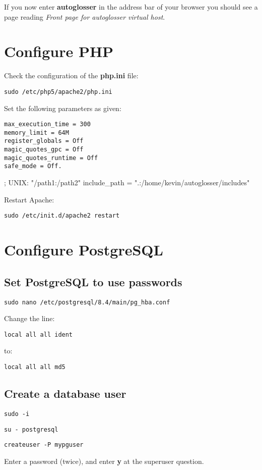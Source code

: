 \documentclass[a4paper,10pt]{article}
\begin{document}
{If you now enter \textbf{autoglosser} in the address bar of your browser you should see a page reading \textit{Front page for autoglosser virtual host}.

\section{Configure PHP}

Check the configuration of the \textbf{php.ini} file:

\texttt{sudo /etc/php5/apache2/php.ini}

Set the following parameters as given:

\begin{verbatim}
max_execution_time = 300
memory_limit = 64M
register_globals = Off
magic_quotes_gpc = Off
magic_quotes_runtime = Off
safe_mode = Off.
\end{verbatim}

; UNIX: "/path1:/path2"
include\_path = ".:/home/kevin/autoglosser/includes"


Restart Apache:

\texttt{sudo /etc/init.d/apache2 restart}

\section{Configure PostgreSQL}

\subsection{Set PostgreSQL to use passwords}

\texttt{sudo nano /etc/postgresql/8.4/main/pg\_hba.conf}

Change the line:

\texttt{local   all	all	ident}

to:

\texttt{local   all	all	md5}

\subsection{Create a database user}
\label{subsec:create-db-user}

\texttt{sudo -i}

\texttt{su - postgresql}

\texttt{createuser -P mypguser}

Enter a password (twice), and enter \textbf{y} at the superuser question.

}
\end{document}
